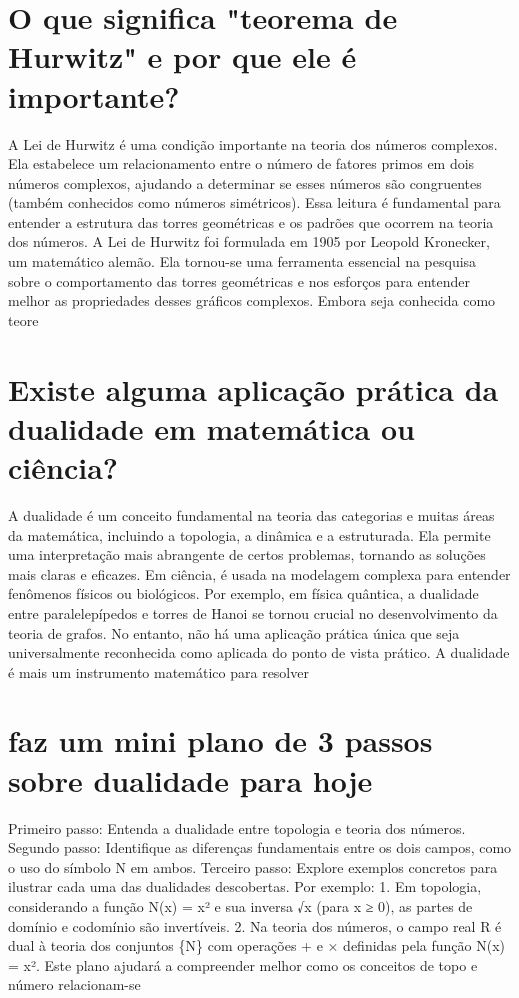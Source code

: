 \documentclass[11pt,a4paper]{article}
\begin{document}
\section{O que significa "teorema de Hurwitz" e por que ele é importante?}
A Lei de Hurwitz é uma condição importante na teoria dos números complexos. Ela estabelece um relacionamento entre o número de fatores primos em dois números complexos, ajudando a determinar se esses números são congruentes (também conhecidos como números simétricos). Essa leitura é fundamental para entender a estrutura das torres geométricas e os padrões que ocorrem na teoria dos números. A Lei de Hurwitz foi formulada em 1905 por Leopold Kronecker, um matemático alemão. Ela tornou-se uma ferramenta essencial na pesquisa sobre o comportamento das torres geométricas e nos esforços para entender melhor as propriedades desses gráficos complexos. Embora seja conhecida como teore

\section{Existe alguma aplicação prática da dualidade em matemática ou ciência?}
A dualidade é um conceito fundamental na teoria das categorias e muitas áreas da matemática, incluindo a topologia, a dinâmica e a estruturada. Ela permite uma interpretação mais abrangente de certos problemas, tornando as soluções mais claras e eficazes. Em ciência, é usada na modelagem complexa para entender fenômenos físicos ou biológicos. Por exemplo, em física quântica, a dualidade entre paralelepípedos e torres de Hanoi se tornou crucial no desenvolvimento da teoria de grafos. No entanto, não há uma aplicação prática única que seja universalmente reconhecida como aplicada do ponto de vista prático. A dualidade é mais um instrumento matemático para resolver

\section{faz um mini plano de 3 passos sobre dualidade para hoje}
Primeiro passo: Entenda a dualidade entre topologia e teoria dos números. Segundo passo: Identifique as diferenças fundamentais entre os dois campos, como o uso do símbolo N em ambos. Terceiro passo: Explore exemplos concretos para ilustrar cada uma das dualidades descobertas. Por exemplo: 1. Em topologia, considerando a função N(x) = x² e sua inversa √x (para x ≥ 0), as partes de domínio e codomínio são invertíveis. 2. Na teoria dos números, o campo real R é dual à teoria dos conjuntos \{N\} com operações + e × definidas pela função N(x) = x². Este plano ajudará a compreender melhor como os conceitos de topo e número relacionam-se
\end{document}
